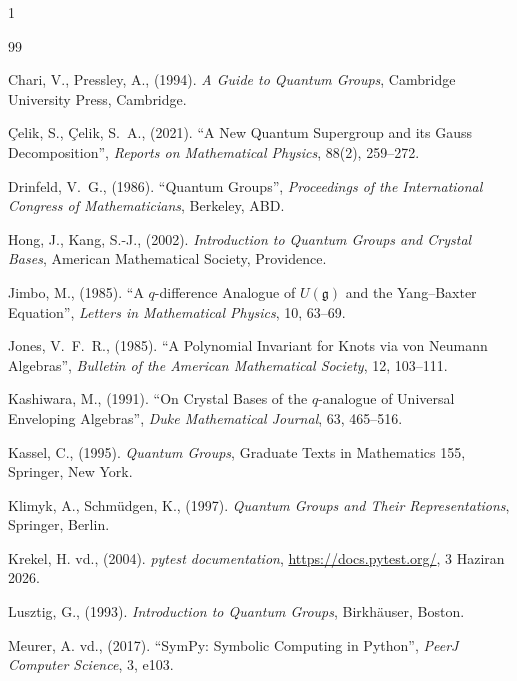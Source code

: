 \FloatBarrier
\begin{spacing}{1}
\begin{thebibliography}{99}
\setlength{\itemsep}{6pt}

Chari, V., Pressley, A., (1994). \emph{A Guide to Quantum Groups}, Cambridge University Press, Cambridge.

Çelik, S., Çelik, S.~A., (2021). ``A New Quantum Supergroup and its Gauss Decomposition'', \emph{Reports on Mathematical Physics}, 88(2), 259--272.

Drinfeld, V.~G., (1986). ``Quantum Groups'', \emph{Proceedings of the International Congress of Mathematicians}, Berkeley, ABD.

Hong, J., Kang, S.-J., (2002). \emph{Introduction to Quantum Groups and Crystal Bases}, American Mathematical Society, Providence.

Jimbo, M., (1985). ``A $q$-difference Analogue of $U(\mathfrak{g})$ and the Yang--Baxter Equation'', \emph{Letters in Mathematical Physics}, 10, 63--69.

Jones, V.~F.~R., (1985). ``A Polynomial Invariant for Knots via von Neumann Algebras'', \emph{Bulletin of the American Mathematical Society}, 12, 103--111.

Kashiwara, M., (1991). ``On Crystal Bases of the $q$-analogue of Universal Enveloping Algebras'', \emph{Duke Mathematical Journal}, 63, 465--516.

Kassel, C., (1995). \emph{Quantum Groups}, Graduate Texts in Mathematics 155, Springer, New York.

Klimyk, A., Schmüdgen, K., (1997). \emph{Quantum Groups and Their Representations}, Springer, Berlin.

Krekel, H. vd., (2004). \emph{pytest documentation}, \url{https://docs.pytest.org/}, 3 Haziran 2026.

Lusztig, G., (1993). \emph{Introduction to Quantum Groups}, Birkhäuser, Boston.

Meurer, A. vd., (2017). ``SymPy: Symbolic Computing in Python'', \emph{PeerJ Computer Science}, 3, e103.

\end{thebibliography}
\end{spacing}
